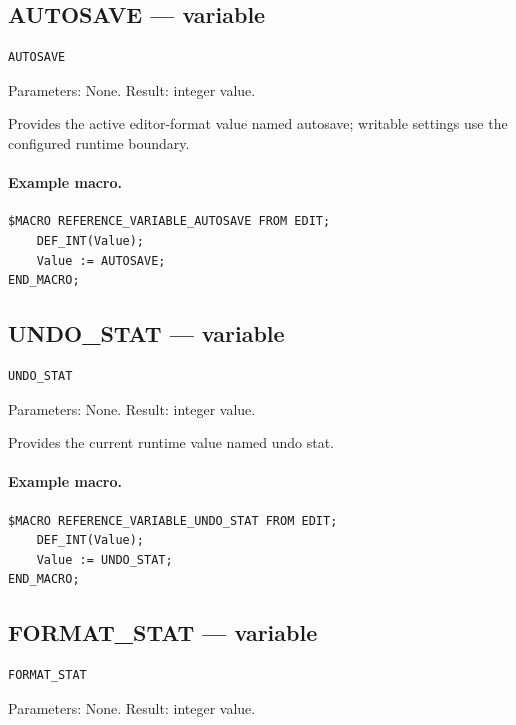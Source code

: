 \documentclass[a4paper,10pt,twoside,openany]{book}
\begin{document}
\label{prim:variable-autosave}
\subsection*{AUTOSAVE --- variable}
\begin{verbatim}
AUTOSAVE
\end{verbatim}
Parameters: None. Result: integer value.

Provides the active editor-format value named autosave; writable settings use the configured runtime boundary.

\paragraph{Example macro.}
\begin{verbatim}
$MACRO REFERENCE_VARIABLE_AUTOSAVE FROM EDIT;
    DEF_INT(Value);
    Value := AUTOSAVE;
END_MACRO;
\end{verbatim}

\label{prim:variable-undo-stat}
\subsection*{UNDO\_STAT --- variable}
\begin{verbatim}
UNDO_STAT
\end{verbatim}
Parameters: None. Result: integer value.

Provides the current runtime value named undo stat.

\paragraph{Example macro.}
\begin{verbatim}
$MACRO REFERENCE_VARIABLE_UNDO_STAT FROM EDIT;
    DEF_INT(Value);
    Value := UNDO_STAT;
END_MACRO;
\end{verbatim}

\label{prim:variable-format-stat}
\subsection*{FORMAT\_STAT --- variable}
\begin{verbatim}
FORMAT_STAT
\end{verbatim}
Parameters: None. Result: integer value.
\end{document}
